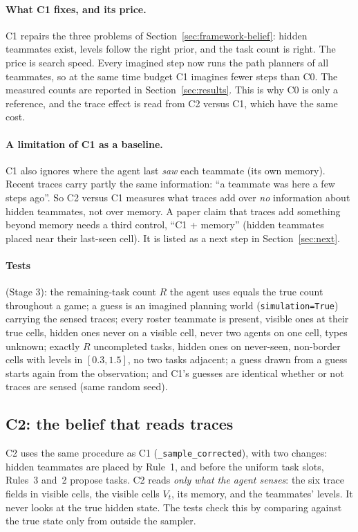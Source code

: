 \documentclass[11pt,a4paper]{article}
\newcommand{\code}[1]{\texttt{#1}}
\theoremstyle{remark}
\begin{document}
\paragraph{What C1 fixes, and its price.} C1 repairs the three problems of Section~\ref{sec:framework-belief}: hidden
teammates exist, levels follow the right prior, and the task count is right. The price is search speed. Every imagined
step now runs the path planners of all teammates, so at the same time budget C1 imagines fewer steps than C0. The
measured counts are reported in Section~\ref{sec:results}. This is why C0 is only a reference, and the trace effect is
read from C2 versus C1, which have the same cost.

\paragraph{A limitation of C1 as a baseline.} C1 also ignores where the agent last \emph{saw} each teammate (its own
memory). Recent traces carry partly the same information: ``a teammate was here a few steps ago''. So C2 versus C1
measures what traces add over \emph{no} information about hidden teammates, not over memory. A paper claim that traces add
something beyond memory needs a third control, ``C1 + memory'' (hidden teammates placed near their last-seen cell). It is
listed as a next step in Section~\ref{sec:next}.

\paragraph{Tests} (Stage 3): the remaining-task count $R$ the agent uses equals the true count throughout a game; a guess
is an imagined planning world (\code{simulation=True}) carrying the sensed traces; every roster teammate is present,
visible ones at their true cells, hidden ones never on a visible cell, never two agents on one cell, types unknown;
exactly $R$ uncompleted tasks, hidden ones on never-seen, non-border cells with levels in $[0.3,1.5]$, no two tasks
adjacent; a guess drawn from a guess starts again from the observation; and C1's guesses are identical whether or not
traces are sensed (same random seed).

\subsection{C2: the belief that reads traces}
\label{sec:c2}

C2 uses the same procedure as C1 (\code{\_sample\_corrected}), with two changes: hidden teammates are placed by
Rule~1, and before the uniform task slots, Rules~3 and~2 propose tasks. C2 reads \emph{only what the agent senses}: the
six trace fields in visible cells, the visible cells $V_t$, its memory, and the teammates' levels. It never looks at the
true hidden state. The tests check this by comparing against the true state only from outside the sampler.
\end{document}
